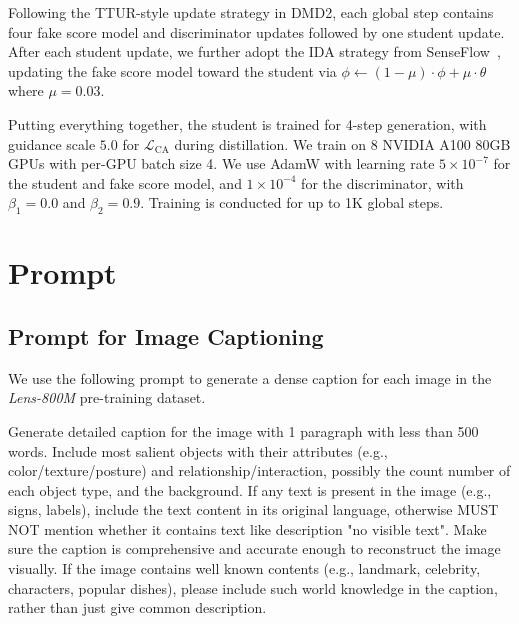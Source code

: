 \documentclass{llmxive}
\begin{document}
Following the TTUR-style update strategy in DMD2, each global step contains four fake score model and discriminator updates followed by one student update. After each student update, we further adopt the IDA strategy from SenseFlow~\citep{senseflow}, updating the fake score model toward the student via $\phi \leftarrow (1-\mu) \cdot \phi+\mu \cdot \theta$ where $\mu=0.03$.

Putting everything together, the student is trained for 4-step generation, with guidance scale $5.0$ for $\mathcal{L_{\mathrm{CA}}}$ during distillation. We train on 8 NVIDIA A100 80GB GPUs with per-GPU batch size 4. We use AdamW with learning rate $5\times10^{-7}$ for the student and fake score model, and $1\times10^{-4}$ for the discriminator, with $\beta_1=0.0$ and $\beta_2=0.9$. Training is conducted for up to 1K global steps.



\section{Prompt}
\label{sec:all-prompts}

\subsection{Prompt for Image Captioning}
\label{sec:prompt-caption}

We use the following prompt to generate a dense caption for each image in the \textit{Lens-800M} pre-training dataset.

\begin{tcolorbox}[
  breakable,
  enhanced,
  colback=white,
  colframe=black!70,
  boxrule=0.8pt,
  arc=2pt,
  title={Prompt for Image Captioning},
  colbacktitle=black!75,
  coltitle=white,
  fonttitle=\bfseries,
  left=8pt,right=8pt,top=8pt,bottom=8pt
]
\footnotesize
Generate detailed caption for the image with 1 paragraph with less than 500 words. Include most salient objects with their attributes (e.g., color/texture/posture) and relationship/interaction, possibly the count number of each object type, and the background. If any text is present in the image (e.g., signs, labels), include the text content in its original language, otherwise MUST NOT mention whether it contains text like description "no visible text". Make sure the caption is comprehensive and accurate enough to reconstruct the image visually.  If the image contains well known contents (e.g., landmark, celebrity, characters, popular dishes), please include such world knowledge in the caption, rather than just give common description.
\end{tcolorbox}
\end{document}

